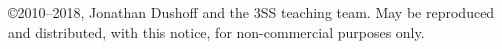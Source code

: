 \copyright 2010--2018, Jonathan Dushoff and the 3SS teaching team.  May be reproduced and distributed, with this notice, for non-commercial purposes only.
